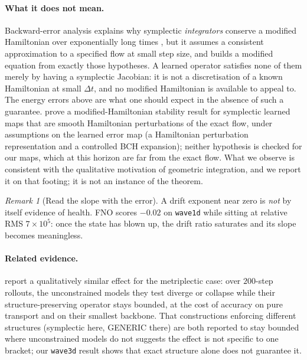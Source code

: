 \documentclass[11pt]{article}
\theoremstyle{definition}
\theoremstyle{remark}
\newtheorem{remark}[theorem]{Remark}
\begin{document}
\paragraph{What it does not mean.} Backward-error analysis explains why
symplectic \emph{integrators} conserve a modified Hamiltonian over exponentially
long times \citep{hairer2006gni}, but it assumes a consistent approximation to a
specified flow at small step size, and builds a modified equation from exactly
those hypotheses. A learned operator satisfies none of them merely by having a
symplectic Jacobian: it is not a discretisation of a known Hamiltonian at small
$\Delta t$, and no modified Hamiltonian is available to appeal to. The energy
errors above are what one should expect in the absence of such a guarantee.
\citet{makara2026sno} prove a modified-Hamiltonian stability result for
symplectic learned maps that are smooth Hamiltonian perturbations of the exact
flow, under assumptions on the learned error map (a Hamiltonian perturbation
representation and a controlled BCH expansion); neither hypothesis is checked for
our maps, which at this horizon are far from the exact flow. What we observe is
consistent with the qualitative motivation of geometric integration, and we
report it on that footing; it is not an instance of the theorem.

\begin{remark}[Read the slope with the error]
A drift exponent near zero is \emph{not} by itself evidence of health. FNO scores
$-0.02$ on \texttt{wave1d} while sitting at relative RMS $7\times10^{5}$: once the
state has blown up, the drift ratio saturates and its slope becomes meaningless.
\end{remark}

\paragraph{Related evidence.} \citet{sulskis2026generic} report a qualitatively
similar effect for the metriplectic case: over $200$-step rollouts, the
unconstrained models they test diverge or collapse while their
structure-preserving operator stays bounded, at the cost of accuracy on pure
transport and on their smallest backbone. That constructions enforcing different
structures (symplectic here, GENERIC there) are both reported to stay bounded
where unconstrained models do not suggests the effect is not specific to one
bracket; our \texttt{wave3d} result shows that exact structure alone does not
guarantee it.
\end{document}
